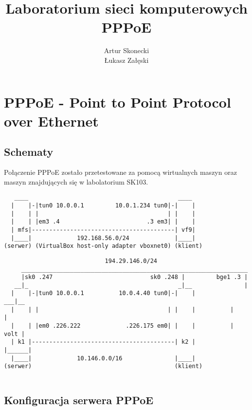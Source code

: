\documentclass[a4paper,11pt]{article}
\title{\textbf{Laboratorium sieci komputerowych\\PPPoE}}
\author{Artur Skonecki\\Łukasz Załęski}
\begin{document}
\maketitle

\section*{PPPoE - Point to Point Protocol over Ethernet}

\subsection*{Schematy}
Połączenie PPPoE zostało przetestowane za pomocą wirtualnych maszyn oraz maszyn znajdujących się w labolatorium SK103.


\begin{verbatim}
   ____                                           ____
  |    |-|tun0 10.0.0.1         10.0.1.234 tun0|-|    |
  |    | |                                     | |    |
  |    | |em3 .4                         .3 em3| |    |
  | mfs|-----------------------------------------| vf9|
  |____|             192.168.56.0/24             |____|
(serwer) (VirtualBox host-only adapter vboxnet0) (klient)

\end{verbatim}

\begin{verbatim}
                             194.29.146.0/24
     _________________________________________________________________
     |sk0 .247                            sk0 .248 |         bge1 .3 |
   __|_                                           _|__               |
  |    |-|tun0 10.0.0.1          10.0.4.40 tun0|-|    |           ___|__
  |    | |                                     | |    |          |      |
  |    | |em0 .226.222             .226.175 em0| |    |          | volt |
  | k1 |-----------------------------------------| k2 |          |______|
  |____|             10.146.0.0/16               |____|
(serwer)                                         (klient)


\end{verbatim}

\subsection*{Konfiguracja serwera PPPoE}
\end{document}
